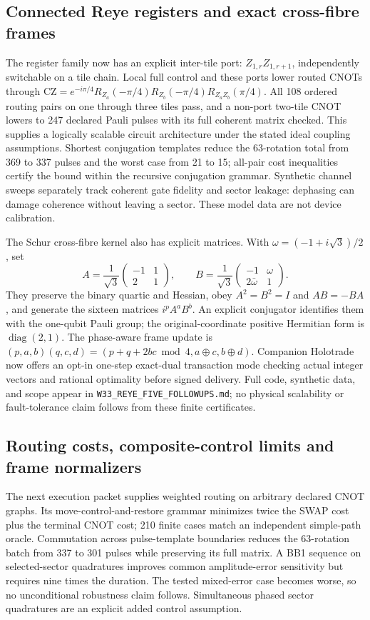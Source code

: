 \subsection{Connected Reye registers and exact cross-fibre frames}
The register family now has an explicit inter-tile port:
$Z_{1,r}Z_{1,r+1}$, independently switchable on a tile chain.
Local full control and these ports lower routed CNOTs through
$\mathrm{CZ}=e^{-i\pi/4}R_{Z_a}(-\pi/4)R_{Z_b}(-\pi/4)R_{Z_aZ_b}(\pi/4)$.
All 108 ordered routing pairs on one through three tiles pass, and a
non-port two-tile CNOT lowers to 247 declared Pauli pulses with its
full coherent matrix checked. This supplies a logically scalable circuit
architecture under the stated ideal coupling assumptions.
Shortest conjugation templates reduce the 63-rotation total from 369 to
337 pulses and the worst case from 21 to 15; all-pair cost inequalities
certify the bound within the recursive conjugation grammar.
Synthetic channel sweeps separately track coherent gate fidelity and
sector leakage: dephasing can damage coherence without leaving a sector.
These model data are not device calibration.

The Schur cross-fibre kernel also has explicit matrices. With
$\omega=(-1+i\sqrt3)/2$, set
\[
 A=\frac1{\sqrt3}\begin{pmatrix}-1&1\\2&1\end{pmatrix},\qquad
 B=\frac1{\sqrt3}\begin{pmatrix}-1&\omega\\2\bar\omega&1\end{pmatrix}.
\]
They preserve the binary quartic and Hessian, obey $A^2=B^2=I$ and
$AB=-BA$, and generate the sixteen matrices $i^pA^aB^b$.
An explicit conjugator identifies them with the one-qubit Pauli group;
the original-coordinate positive Hermitian form is $\operatorname{diag}(2,1)$.
The phase-aware frame update is
$(p,a,b)(q,c,d)=(p+q+2bc\bmod4,a\mathbin\oplus c,b\mathbin\oplus d)$.
Companion Holotrade now offers an opt-in one-step exact-dual transaction
mode checking actual integer vectors and rational optimality before signed
delivery. Full code, synthetic data, and scope appear in
\texttt{W33\_REYE\_FIVE\_FOLLOWUPS.md}; no physical scalability or
fault-tolerance claim follows from these finite certificates.

\subsection{Routing costs, composite-control limits and frame normalizers}
The next execution packet supplies weighted routing on arbitrary declared
CNOT graphs.  Its move-control-and-restore grammar minimizes twice the
SWAP cost plus the terminal CNOT cost; 210 finite cases match an independent
simple-path oracle.  Commutation across pulse-template boundaries reduces
the 63-rotation batch from 337 to 301 pulses while preserving its full matrix.
A BB1 sequence on selected-sector quadratures improves common amplitude-error
sensitivity but requires nine times the duration.  The tested mixed-error
case becomes worse, so no unconditional robustness claim follows.
Simultaneous phased sector quadratures are an explicit added control assumption.

